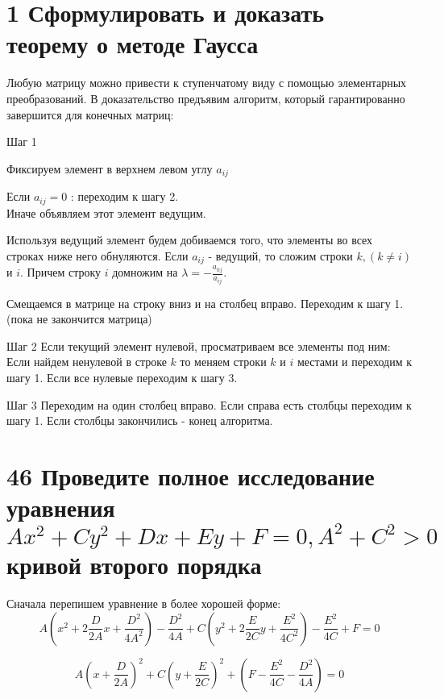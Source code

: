 \documentclass[a4paper,12pt]{article}
\newenvironment{my_enumerate}{
\begin{enumerate}
  \setlength{\itemsep}{1pt}
  \setlength{\parskip}{0pt}
  \setlength{\parsep}{0pt}}{\end{enumerate}
}
\begin{document}
\section{1 Сформулировать и доказать теорему о методе Гаусса}
Любую матрицу можно привести к ступенчатому виду с помощью элементарных преобразований.
В доказательство предъявим алгоритм, который гарантированно завершится для конечных матриц:
\begin{my_enumerate}
\item[Шаг 1]
\begin{my_enumerate}
\item Фиксируем элемент в верхнем левом углу $ a_{ij} $
\item Если $a_{ij} = 0$ : переходим к шагу 2. \\
Иначе объявляем этот элемент ведущим.
\item Используя ведущий элемент будем добиваемся того, что элементы во всех строках ниже него обнуляются. Если $ a_{ij} $ - ведущий, то сложим строки $ k, ( k \neq i ) $ и $i$. Причем строку $i$ домножим на $ \lambda = - \frac{a_{kj}}{a_{ij}}$.
\item Смещаемся в матрице на строку вниз и на столбец вправо. Переходим к шагу 1. (пока не закончится матрица)
\end{my_enumerate}

\item[Шаг 2] Если текущий элемент нулевой, просматриваем все элементы под ним: Если найдем ненулевой в строке $k$ то меняем строки $k$ и $i$ местами и переходим к шагу 1. Если все нулевые переходим к шагу 3.

\item[Шаг 3] Переходим на один столбец вправо. Если справа есть столбцы переходим к шагу 1. Если столбцы закончились - конец алгоритма. 

\end{my_enumerate}


\section{46 Проведите полное исследование уравнения \texorpdfstring{$ Ax^2 + Cy^2 + Dx + Ey + F = 0, A^2 + C^2 > 0$}{TEXT} кривой второго порядка}

Сначала перепишем уравнение в более хорошей форме:
\[
    A \left(  x^2 + 2\frac{D}{2A}x + \frac{D^2}{4A^2}  \right) - \frac{D^2}{4A} 
+ C \left(  y^2 + 2\frac{E}{2C}y + \frac{E^2}{4C^2}  \right) - \frac{E^2}{4C}
+ F = 0 
\]

\[
    A \left( x + \frac{D}{2A} \right) ^2 
+ C \left( y + \frac{E}{2C}  \right) ^2 
+ \left( F - \frac{E^2}{4C}  - \frac{D^2}{4A} \right) = 0
\]
\end{document}
